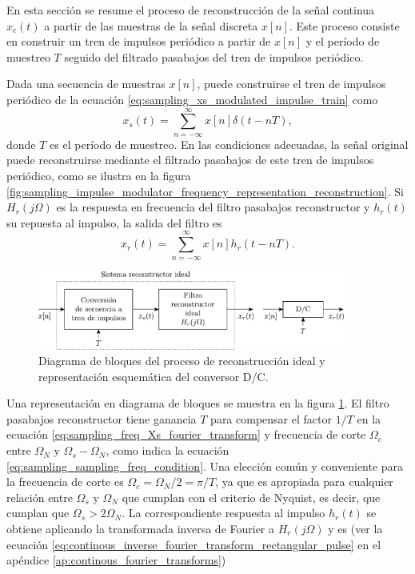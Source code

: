 \documentclass[a4paper]{report}
\begin{document}
En esta sección se resume el proceso de reconstrucción de la señal continua \(x_c(t)\) a partir de las muestras de la señal discreta \(x[n]\). Este proceso consiste en construir un tren de impulsos periódico a partir de \(x[n]\) y el período de muestreo \(T\) seguido del filtrado pasabajos del tren de impulsos periódico.

Dada una secuencia de muestras \(x[n]\), puede construirse el tren de impulsos periódico de la ecuación \ref{eq:sampling_xs_modulated_impulse_train} como
\begin{equation}\label{eq:sampling_modulated_impulse_train_xs_from_xn}
 x_s(t)=\sum_{n=-\infty}^\infty x[n]\delta(t-nT), 
\end{equation}
donde \(T\) es el período de muestreo. En las condiciones adecuadas, la señal original puede reconstruirse mediante el filtrado pasabajos de este tren de impulsos periódico, como se ilustra en la figura \ref{fig:sampling_impulse_modulator_frequency_representation_reconstruction}. Si \(H_r(j\Omega)\) es la respuesta en frecuencia del filtro pasabajos reconstructor y \(h_r(t)\) su repuesta al impulso, la salida del filtro es
\begin{equation}\label{eq:sampling_reconstructed_signal_xr_in_terms_hr}
 x_r(t)=\sum_{n=-\infty}^\infty x[n]h_r(t-nT). 
\end{equation}
\begin{figure}[!htb]
 \begin{center}
 \includegraphics[width=0.90\textwidth]{figuras/sampling_discrete_continous_converter_block_diagram.pdf}
 \caption{\label{fig:sampling_discrete_continous_converter_block_diagram} Diagrama de bloques del proceso de reconstrucción ideal y representación esquemática del conversor D/C.}
 \end{center}
\end{figure}
Una representación en diagrama de bloques se muestra en la figura \ref{fig:sampling_discrete_continous_converter_block_diagram}. El filtro pasabajos reconstructor tiene ganancia \(T\) para compensar el factor \(1/T\) en la ecuación \ref{eq:sampling_freq_Xs_fourier_transform} y frecuencia de corte \(\Omega_c\) entre \(\Omega_N\) y \(\Omega_s-\Omega_N\), como indica la ecuación \ref{eq:sampling_sampling_freq_condition}. Una elección común y conveniente para la frecuencia de corte es \(\Omega_c=\Omega_N/2=\pi/T\), ya que es apropiada para cualquier relación entre \(\Omega_s\) y \(\Omega_N\) que cumplan con el criterio de Nyquist, es decir, que cumplan que  \(\Omega_s>2\Omega_N\). La correspondiente respuesta al impulso \(h_r(t)\) se obtiene aplicando la transformada inversa de Fourier a \(H_r(j\Omega)\) y es (ver la ecuación \ref{eq:continous_inverse_fourier_transform_rectangular_pulse} en el apéndice \ref{ap:continous_fourier_transforms})
\end{document}
